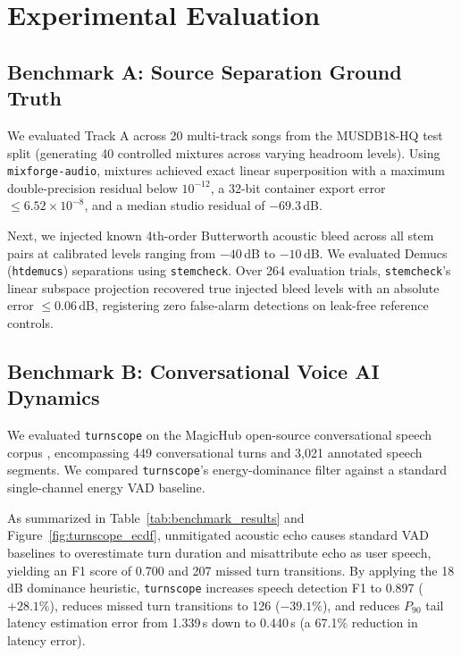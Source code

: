 \documentclass[10pt,journal,compsoc]{IEEEtran}
\begin{document}
\newpage
\section{Experimental Evaluation}

\subsection{Benchmark A: Source Separation Ground Truth}
We evaluated Track A across 20 multi-track songs from the MUSDB18-HQ test split (generating 40 controlled mixtures across varying headroom levels). Using \texttt{mixforge-audio}, mixtures achieved exact linear superposition with a maximum double-precision residual below $10^{-12}$, a 32-bit container export error $\le 6.52 \times 10^{-8}$, and a median studio residual of $-69.3$\,dB.

Next, we injected known 4th-order Butterworth acoustic bleed across all stem pairs at calibrated levels ranging from $-40$\,dB to $-10$\,dB. We evaluated Demucs (\texttt{htdemucs}) separations using \texttt{stemcheck}. Over 264 evaluation trials, \texttt{stemcheck}'s linear subspace projection recovered true injected bleed levels with an absolute error $\le 0.06$\,dB, registering zero false-alarm detections on leak-free reference controls.

\subsection{Benchmark B: Conversational Voice AI Dynamics}
We evaluated \texttt{turnscope} on the MagicHub open-source conversational speech corpus \cite{magichub2021}, encompassing 449 conversational turns and 3,021 annotated speech segments. We compared \texttt{turnscope}'s energy-dominance filter against a standard single-channel energy VAD baseline.

As summarized in Table~\ref{tab:benchmark_results} and Figure~\ref{fig:turnscope_ecdf}, unmitigated acoustic echo causes standard VAD baselines to overestimate turn duration and misattribute echo as user speech, yielding an F1 score of 0.700 and 207 missed turn transitions. By applying the 18\,dB dominance heuristic, \texttt{turnscope} increases speech detection F1 to 0.897 ($+28.1\%$), reduces missed turn transitions to 126 ($-39.1\%$), and reduces $P_{90}$ tail latency estimation error from 1.339\,s down to 0.440\,s (a 67.1\% reduction in latency error).
\end{document}
